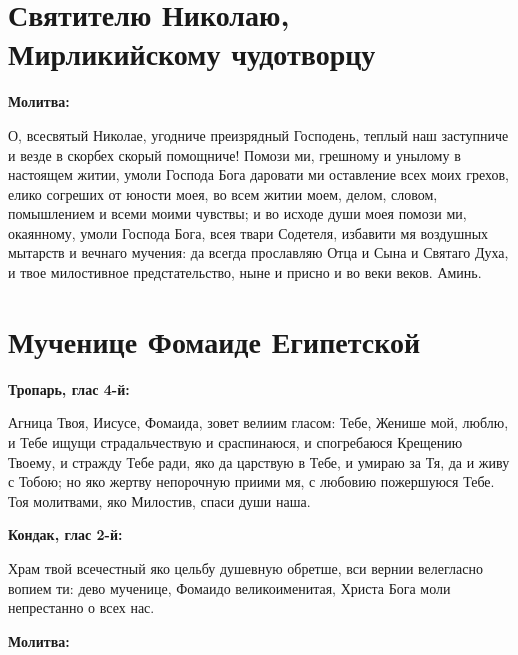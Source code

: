 



\section{Святителю Николаю, Мирликийскому чудотворцу}
 
\bfseries Молитва:\normalfont{}


О, всесвятый Николае, угодниче преизрядный Господень, теплый наш заступниче и везде в скорбех скорый помощниче! Помози ми, грешному и унылому в настоящем житии, умоли Господа Бога даровати ми оставление всех моих грехов, елико согреших от юности моея, во всем житии моем, делом, словом, помышлением и всеми моими чувствы; и во исходе души моея помози ми, окаянному, умоли Господа Бога, всея твари Содетеля, избавити мя воздушных мытарств и вечнаго мучения: да всегда прославляю Отца и Сына и Святаго Духа, и твое милостивное предстательство, ныне и присно и во веки веков. Аминь. 

 




 

\section{Мученице Фомаиде Египетской}
 
\bfseries Тропарь, глас 4-й:\normalfont{}

 Агница Твоя, Иисусе, Фомаида, зовет велиим гласом: Тебе, Женише мой, люблю, и Тебе ищущи страдальчествую и сраспинаюся, и спогребаюся Крещению Твоему, и стражду Тебе ради, яко да царствую в Тебе, и умираю за Тя, да и живу с Тобою; но яко жертву непорочную приими мя, с любовию пожершуюся Тебе. Тоя молитвами, яко Милостив, спаси души наша.





\bfseries Кондак, глас 2-й:\normalfont{}

 Храм твой всечестный яко цельбу душевную обретше, вси вернии велегласно вопием ти: дево мученице, Фомаидо великоименитая, Христа Бога моли непрестанно о всех нас.





\bfseries Молитва:\normalfont{}

